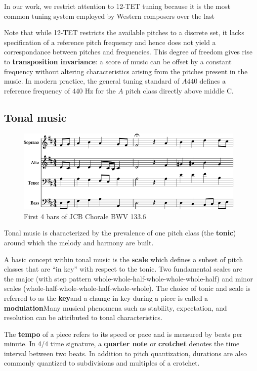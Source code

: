 In our work, we restrict attention to 12-TET tuning because it is the most
common tuning system employed by Western composers over the last 

Note that while 12-TET restricts the available pitches to a discrete set, it
lacks specification of a reference pitch frequency and hence does not yield a
correspondance between pitches and frequencies. This degree of freedom gives
rise to \textbf{transposition invariance}: a score of music can be offset by a
constant frequency without altering characteristics arising from the pitches
present in the music. In modern practice, the general tuning standard of $A440$
defines a reference frequency of 440 Hz for the $A$ pitch class directly above
middle C.

\subsection{Tonal music}

\begin{figure}[htbp]
    \centering
    \includegraphics[width=0.8\linewidth]{Figures/bwv133-6-original-score-1.png}
    \caption{First 4 bars of JCB Chorale BWV 133.6}
    \label{fig:score-original}
\end{figure}

Tonal music is characterized by the prevalence of one pitch class (the
\textbf{tonic}) around which the melody and harmony are built.

A basic concept within tonal music is the \textbf{scale} which defines a subset
of pitch classes that are ``in key'' with respect to the tonic. Two fundamental
scales are the major (with step pattern
whole-whole-half-whole-whole-whole-half) and minor scales
(whole-half-whole-whole-half-whole-whole). The choice of tonic and scale is
referred to as the \textbf{key}and a change in key during a piece is called a
\textbf{modulation}Many musical phenomena such as stability, expectation, and
resolution can be attributed to tonal characteristics.

The \textbf{tempo} of a piece refers to its speed or pace and is measured by
beats per minute. In 4/4 time signature, a \textbf{quarter note} or
\textbf{crotchet} denotes the time interval between two beats. In addition to
pitch quantization, durations are also commonly quantized to subdivisions and
multiples of a crotchet.

